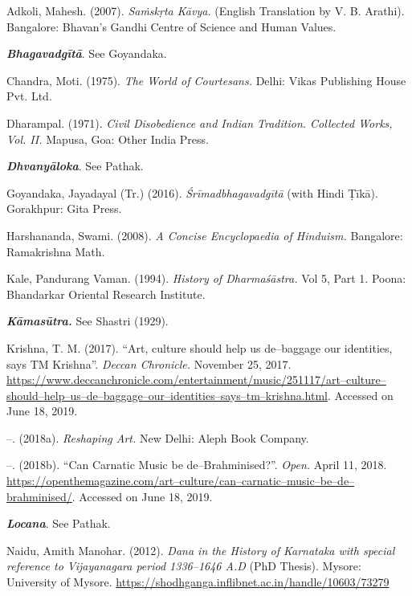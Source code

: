 \begin{thebibliography}{99}
 Adkoli, Mahesh. (2007). \textit{Saṁskṛta Kāvya.} (English Translation by V. B. Arathi). Bangalore: Bhavan’s Gandhi Centre of Science and Human Values.

  \textit{\textbf{Bhagavadgītā}}. See Goyandaka.

  Chandra, Moti. (1975). \textit{The World of Courtesans.} Delhi: Vikas Publishing House Pvt. Ltd.

  Dharampal. (1971). \textit{Civil Disobedience and Indian Tradition. Collected Works, Vol. II.} Mapusa, Goa: Other India Press.

  \textit{\textbf{Dhvanyāloka}}. See Pathak.

  Goyandaka, Jayadayal (Tr.) (2016). \textit{Śrīmadbhagavadgītā} (with Hindi Ṭīkā). Gorakhpur: Gita Press.

  Harshananda, Swami. (2008). \textit{A Concise Encyclopaedia of Hinduism.} Bangalore: Ramakrishna Math.

  Kale, Pandurang Vaman. (1994). \textit{History of Dharmaśāstra.} Vol 5, Part 1. Poona: Bhandarkar Oriental Research Institute.

  \textit{\textbf{Kāmasūtra.}} See Shastri (1929).

  Krishna, T. M. (2017). “Art, culture should help us de–baggage our identities, says TM Krishna”. \textit{Deccan Chronicle.} November 25, 2017. \url{https://www.deccanchronicle.com/entertainment/music/251117/art–culture–should–help–us–de–baggage–our–identities–says–tm–krishna.html}. Accessed on June 18, 2019.

  –. (2018a). \textit{Reshaping Art.} New Delhi: Aleph Book Company.

  –. (2018b). “Can Carnatic Music be de–Brahminised?”. \textit{Open.} April 11, 2018. \url{https://openthemagazine.com/art–culture/can–carnatic–music–be–de–brahminised/}. Accessed on June 18, 2019.

  \textit{\textbf{Locana}}. See Pathak.

  Naidu, Amith Manohar. (2012). \textit{Dana in the History of Karnataka with special reference to Vijayanagara period 1336–1646 A.D} (PhD Thesis). Mysore: University of Mysore. \url{https://shodhganga.inflibnet.ac.in/handle/10603/73279}


\end{thebibliography}
